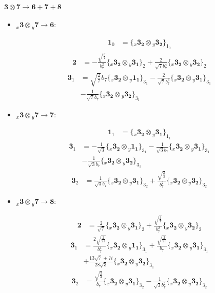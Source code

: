 \documentclass[english]{article}
\newcommand{\cgEqFontsize}{\large}
\newcommand{\rep}[1]{\mathbf{#1}}
\newcommand{\repx}[2]{{}_{#2}\mathbf{#1}}
\newcommand{\tsprod}[2]{\rep{#1}\otimes\rep{#2}}
\newcommand{\tsprodx}[2]{\repx{#1}{x}\otimes\repx{#2}{y}}
\newcommand{\subcgs}[3]{\big\{ \tsprodx{#1}{#2}\big\}^{}_{#3}}
\newcommand{\bfl}{\begin{fleqn}[25pt]}
\newcommand{\efl}{\end{fleqn}}
\begin{document}
\paragraph*{\cgEqFontsize $\tsprod{3}{7}\to\rep{6}+\rep{7}+\rep{8}$}
\begin{itemize}
\item $\tsprodx{3}{7}\to\rep{6}$:
\bfl
\begin{align*}
\rep{1}_{0} & = \subcgs{3_{2}}{3_{2}}{1_{0}}
\end{align*}
\begin{align*}
\rep{2} & = -\frac{\sqrt{\frac{3}{7}}}{b_7^2}\subcgs{3_{2}}{3_{1}}{2}+\frac{2}{\sqrt{7} b_7^4}\subcgs{3_{2}}{3_{2}}{2}
\end{align*}
\begin{align*}
\rep{3}_{1} & = \sqrt{\frac{2}{7}} b_7\subcgs{3_{2}}{1_{1}}{3_{1}}-\frac{2}{\sqrt{7} b_7^3}\subcgs{3_{2}}{3_{1}}{3_{1}} \\ 
 & -\frac{1}{\sqrt{7} b_7}\subcgs{3_{2}}{3_{2}}{3_{1}}
\end{align*}
\efl
\item $\tsprodx{3}{7}\to\rep{7}$:
\bfl
\begin{align*}
\rep{1}_{1} & = \subcgs{3_{2}}{3_{1}}{1_{1}}
\end{align*}
\begin{align*}
\rep{3}_{1} & = -\frac{1}{\sqrt{3}}\subcgs{3_{2}}{1_{1}}{3_{1}}-\frac{1}{\sqrt{3} b_7}\subcgs{3_{2}}{3_{1}}{3_{1}} \\ 
 & -\frac{1}{\sqrt{3} b_7}\subcgs{3_{2}}{3_{2}}{3_{1}}
\end{align*}
\begin{align*}
\rep{3}_{2} & = \frac{1}{\sqrt{3} b_7}\subcgs{3_{2}}{3_{1}}{3_{2}}+\frac{\sqrt{\frac{2}{3}}}{b_7^2}\subcgs{3_{2}}{3_{2}}{3_{2}}
\end{align*}
\efl
\item $\tsprodx{3}{7}\to\rep{8}$:
\bfl
\begin{align*}
\rep{2} & = \frac{2}{\sqrt{7}}\subcgs{3_{2}}{3_{1}}{2}+\frac{\sqrt{\frac{3}{7}}}{b_7^2}\subcgs{3_{2}}{3_{2}}{2}
\end{align*}
\begin{align*}
\rep{3}_{1} & = \frac{2 \sqrt{\frac{2}{21}}}{b_7^4}\subcgs{3_{2}}{1_{1}}{3_{1}}+\frac{\sqrt{\frac{2}{21}}}{b_7}\subcgs{3_{2}}{3_{1}}{3_{1}} \\ 
 & +\frac{13 \sqrt{7}+7 i}{28 \sqrt{3}}\subcgs{3_{2}}{3_{2}}{3_{1}}
\end{align*}
\begin{align*}
\rep{3}_{2} & = \frac{\sqrt{\frac{2}{3}}}{b_7}\subcgs{3_{2}}{3_{1}}{3_{2}}-\frac{1}{\sqrt{3} b_7^2}\subcgs{3_{2}}{3_{2}}{3_{2}}
\end{align*}
\efl
\end{itemize}
\end{document}
